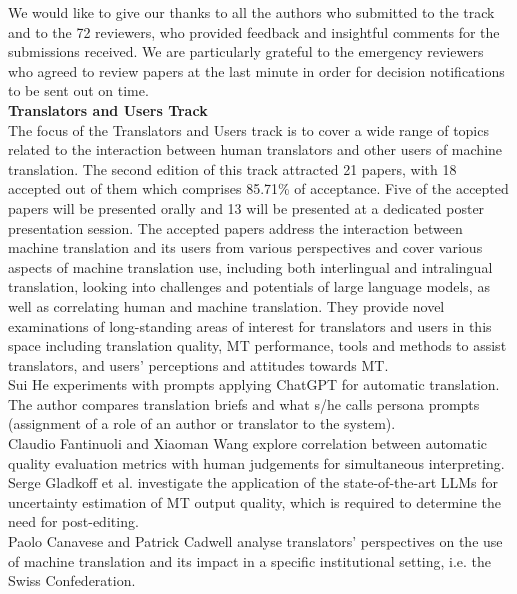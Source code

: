 We would like to give our thanks to all the authors who submitted to the track and to the 72 reviewers, who provided feedback and insightful comments for the submissions received. We are particularly grateful to the emergency reviewers who agreed to review papers at the last minute in order for decision notifications to be sent out on time.
\\


{\bf Translators and Users Track}
\\

The focus of the Translators and Users track is to cover a wide range of topics related to the interaction between human translators and other users of machine translation. The second edition of this track attracted 21 papers, with 18 accepted out of them which comprises 85.71\% of acceptance. Five of the accepted papers will be presented orally and 13 will be presented at a dedicated poster presentation session. The accepted papers address the interaction between machine translation and its users from various perspectives and cover various aspects of machine translation use, including both interlingual and intralingual translation, looking into challenges and potentials of large language models, as well as correlating human and machine translation. They provide novel examinations of long-standing areas of interest for translators and users in this space including translation quality, MT performance, tools and methods to assist translators, and users’ perceptions and attitudes towards MT.
\\

Sui He experiments with prompts applying ChatGPT for automatic translation. The author compares translation briefs and what s/he calls persona prompts (assignment of a role of an author or translator to the system). 
\\

Claudio Fantinuoli and Xiaoman Wang explore correlation between automatic quality evaluation metrics with human judgements for simultaneous interpreting. 
\\

Serge Gladkoff et al. investigate the application of the state-of-the-art LLMs for uncertainty estimation of MT output quality, which is required to determine the need for post-editing.
\\

Paolo Canavese and Patrick Cadwell analyse translators’ perspectives on the use of machine translation and its impact in a specific institutional setting, i.e. the Swiss Confederation.
\\

